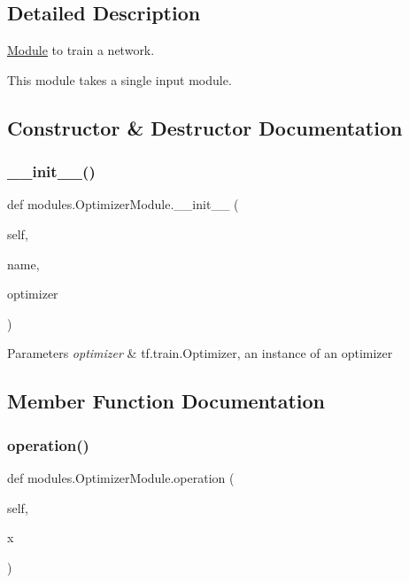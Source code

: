 \subsection{Detailed Description}
\hyperlink{classmodules_1_1_module}{Module} to train a network. 

This module takes a single input module. 

\subsection{Constructor \& Destructor Documentation}
\mbox{\label{classmodules_1_1_optimizer_module_a82007e9145e1e80e6485c2de0f7ec5b6}} 
\subsubsection{\texorpdfstring{\+\_\+\+\_\+init\+\_\+\+\_\+()}{\_\_init\_\_()}}
{\footnotesize\ttfamily def modules.\+Optimizer\+Module.\+\_\+\+\_\+init\+\_\+\+\_\+ (\begin{DoxyParamCaption}\item[{}]{self,  }\item[{}]{name,  }\item[{}]{optimizer }\end{DoxyParamCaption})}


\begin{DoxyParams}{Parameters}
{\em optimizer} & tf.\+train.\+Optimizer, an instance of an optimizer \\
\hline
\end{DoxyParams}


\subsection{Member Function Documentation}
\mbox{\label{classmodules_1_1_optimizer_module_ad8ab7a66f2eb4b2480bd1eea28a28f79}} 
\subsubsection{\texorpdfstring{operation()}{operation()}}
{\footnotesize\ttfamily def modules.\+Optimizer\+Module.\+operation (\begin{DoxyParamCaption}\item[{}]{self,  }\item[{}]{x }\end{DoxyParamCaption})}



